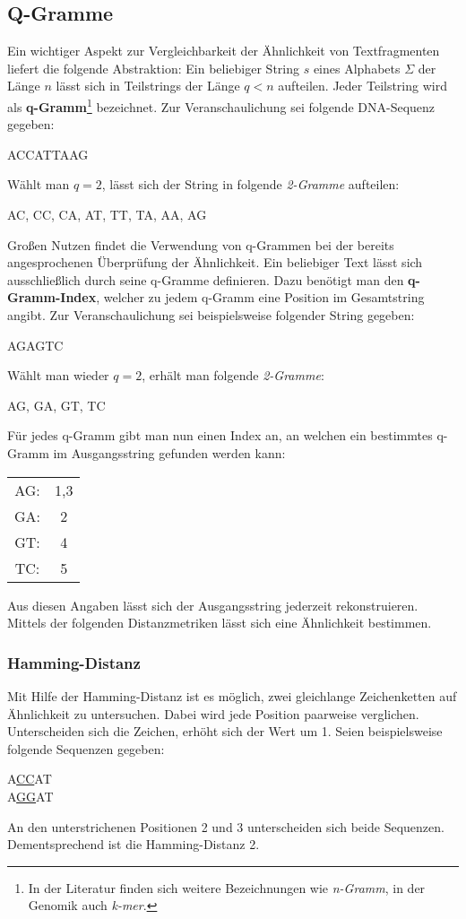 \subsection{Q-Gramme}
\label{sec:hash:qgram}
Ein wichtiger Aspekt zur Vergleichbarkeit der Ähnlichkeit von Textfragmenten liefert die folgende Abstraktion: Ein beliebiger String $s$ eines Alphabets $\Sigma$ der Länge $n$ lässt sich in Teilstrings der Länge $q < n$ aufteilen. Jeder Teilstring wird als \textbf{q-Gramm}\footnote{In der Literatur finden sich weitere Bezeichnungen wie \textit{n-Gramm}, in der Genomik auch \textit{k-mer}.} bezeichnet. Zur Veranschaulichung sei folgende DNA-Sequenz gegeben:
\begin{center}
	ACCATTAAG
\end{center}
Wählt man $q = 2$, lässt sich der String in folgende \textit{2-Gramme} aufteilen:
\begin{center}
	AC, CC, CA, AT, TT, TA, AA, AG
\end{center}
Großen Nutzen findet die Verwendung von q-Grammen bei der bereits angesprochenen Überprüfung der Ähnlichkeit. Ein beliebiger Text lässt sich ausschließlich durch seine q-Gramme definieren. Dazu benötigt man den \textbf{q-Gramm-Index}, welcher zu jedem q-Gramm eine Position im Gesamtstring angibt. Zur Veranschaulichung sei beispielsweise folgender String gegeben:
\begin{center}
	AGAGTC
\end{center}
Wählt man wieder $q = 2$, erhält man folgende \textit{2-Gramme}:
\begin{center}
	AG, GA, GT, TC
\end{center}
Für jedes q-Gramm gibt man nun einen Index an, an welchen ein bestimmtes q-Gramm im Ausgangsstring gefunden werden kann:
\begin{center}
\begin{tabular}{cc}
AG: & 1,3 \\ 
GA: & 2 \\ 
GT: & 4 \\ 
TC: & 5 \\ 
\end{tabular} 
\end{center}
Aus diesen Angaben lässt sich der Ausgangsstring jederzeit rekonstruieren. Mittels der folgenden Distanzmetriken lässt sich eine Ähnlichkeit bestimmen.
\subsubsection{Hamming-Distanz}
Mit Hilfe der Hamming-Distanz ist es möglich, zwei gleichlange Zeichenketten auf Ähnlichkeit zu untersuchen. Dabei wird jede Position paarweise verglichen. Unterscheiden sich die Zeichen, erhöht sich der Wert um 1. Seien beispielsweise folgende Sequenzen gegeben:
\begin{center}
	A\underline{CC}AT \\
	A\underline{GG}AT
\end{center}
An den unterstrichenen Positionen 2 und 3 unterscheiden sich beide Sequenzen. Dementsprechend ist die Hamming-Distanz 2.
